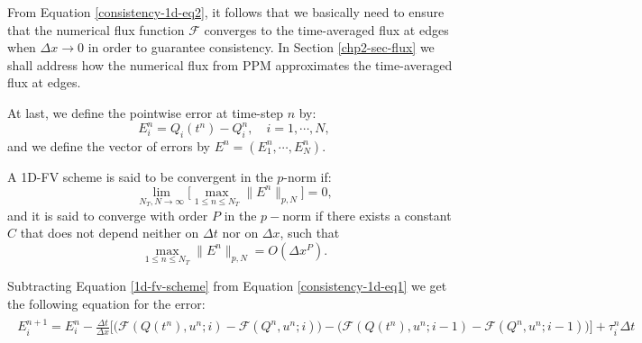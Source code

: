 From Equation \eqref{consistency-1d-eq2}, it follows that we basically need to ensure that 
the numerical flux function $\mathcal{F}$ converges to the time-averaged flux at edges
when $\Delta x \to 0$ in order to guarantee consistency.
In Section \ref{chp2-sec-flux} we shall address how the numerical flux from PPM
approximates the time-averaged flux at edges.

At last, we define the pointwise error at time-step $n$ by:
\begin{equation*}
	E_i^n = Q_i(t^n) - Q_i^n, \quad i=1, \cdots, N,
\end{equation*}
and we define the vector of errors by $E^n = (E_1^n, \cdots, E_N^n)$. 
\begin{definition}
	A 1D-FV scheme is said to be convergent in the $p$-norm if:
	\begin{equation*}
		\lim_{N_T, N \to \infty}\bigg[ {\max_{1\leq n\leq N_T}}{\|E^n\|_{p,N}} \bigg] = 0,
	\end{equation*}
	and it is said to converge with order $P$ in the $p-$norm if there exists a constant 
	$C$ that does not depend neither on $\Delta t$ nor on $\Delta x$, such that
	\begin{equation*}
		{\max_{1\leq n\leq N_T}}{\|E^n\|_{p,N}} = O(\Delta x^P).
	\end{equation*}
\end{definition}

Subtracting Equation \eqref{1d-fv-scheme} from Equation \eqref{consistency-1d-eq1} we get
the following equation for the error:
\begin{align}
	\begin{split}
	\label{erroreq-1d-eq2}
		E^{n+1}_i = E^n_i -
		\frac{\Delta t}{\Delta x} 
		\bigg[
			\bigg(\mathcal{F}(Q(t^n),u^n;i) - \mathcal{F}(Q^n,u^n;i) \bigg) -
			\bigg( \mathcal{F}(Q(t^n),u^n;i-1) -  \mathcal{F}(Q^n,u^n;i-1) \bigg)
		\bigg] 
		+ \tau_{i}^n \Delta t 
	\end{split}
\end{align}

